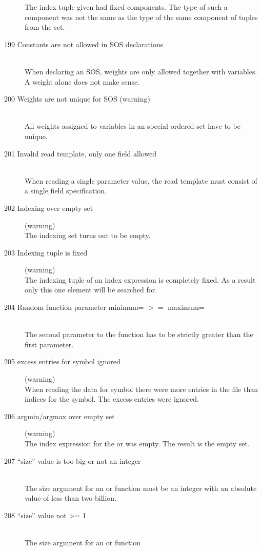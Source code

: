 \begin{description}
  The index tuple given had fixed components. The type of such a
  component was not the same as the type of the same component of tuples
  from the set.
\item[199 Constants are not allowed in SOS declarations]\ \\
  When declaring an SOS, weights are only allowed together with
  variables. A weight alone does not make sense.
\item[200 Weights are not unique for SOS \code{xxx} (warning)]\ \\
  All weights assigned to variables in an special ordered set have to
  be unique. 
\item[201 Invalid read template, only one field allowed]\ \\
  When reading a single parameter value, the read template must
  consist of a single field specification.
\item[202 Indexing over empty set] (warning)\ \\
  The indexing set turns out to be empty.
\item[203 Indexing tuple is fixed] (warning)\ \\
  The indexing tuple of an index expression is completely fixed. As a
  result only this one element will be searched for.
\item[204 Random function parameter minimum= \code{xxx} $>=$ maximum=
  \code{yyy}]\ \\
  The second parameter to the function  has to be
  strictly greater than the first parameter.
\item[205 \code{xxx} excess entries for symbol \code{yyy} ignored ]
  (warning)\ \\
  When reading the data for symbol  there were 
   more entries in the file than indices for the symbol.
  The excess entries were ignored.  
\item[206 argmin/argmax over empty set] (warning)\ \\
   The index expression for the  or  was
   empty. The result is the empty set.
\item[207 ``size'' value \code{xxx} is too big or not an integer]\ \\
   The size argument for an  or  function
   must be an integer with an absolute value of less than two billion.
\item[208 ``size'' value \code{xxx} not >= 1]\ \\
   The size argument for an  or  function

\end{description}
